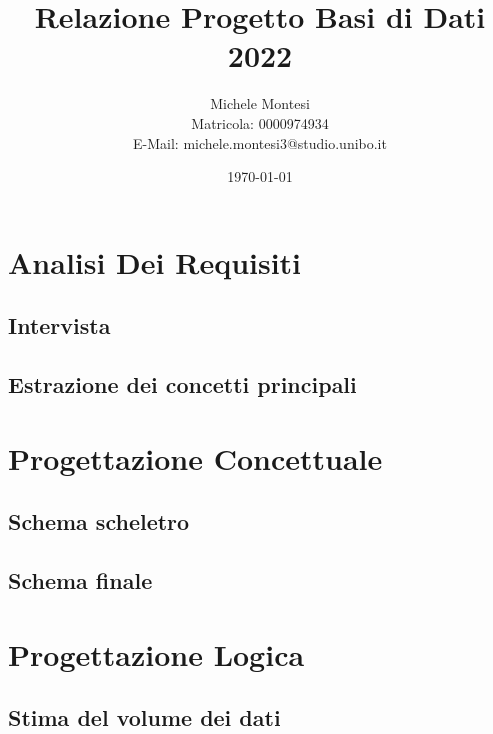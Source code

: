 \documentclass[a4paper, 12pt]{report}
\title{Relazione Progetto Basi di Dati 2022}
\author{Michele Montesi \\
        Matricola: 0000974934 \\
        E-Mail: michele.montesi3@studio.unibo.it}
\date{\today}
\begin{document}
    
\maketitle
\tableofcontents

\chapter[]{Analisi Dei Requisiti}

\section[]{Intervista}

\section[]{Estrazione dei concetti principali}

\chapter[]{Progettazione Concettuale}

\section[]{Schema scheletro}

\section[]{Schema finale}

\chapter[]{Progettazione Logica}

\section[]{Stima del volume dei dati}
\end{document}
